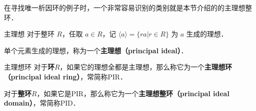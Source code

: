 

在寻找唯一析因环的例子时，一个非常容易识别的类别就是本节介绍的的主理想整环．

\begin{definition}{主理想}
对于整环 $R$，任取 $a\in R$，记 $\langle a \rangle=\{ra|r\in R\}$ 为 $a$ 生成的理想．

单个元素生成的理想，称为一个\textbf{主理想（principal ideal）}．
\end{definition}

\begin{definition}{主理想环}
对于\textbf{环}$R$，如果它的理想全都是主理想，那么称它为一个\textbf{主理想环（principal ideal ring）}，常简称PIR．

对于\textbf{整环}$R$，如果它是PIR，那么称它为一个\textbf{主理想整环（principal ideal domain）}，常简称PID．
\end{definition}







